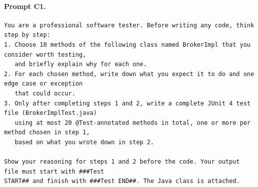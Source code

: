 \paragraph*{Prompt C1.}
\label{prompt:c1}
\begin{lstlisting}
You are a professional software tester. Before writing any code, think step by step:
1. Choose 10 methods of the following class named BrokerImpl that you consider worth testing,
   and briefly explain why for each one.
2. For each chosen method, write down what you expect it to do and one edge case or exception
   that could occur.
3. Only after completing steps 1 and 2, write a complete JUnit 4 test file (BrokerImplTest.java)
   using at most 20 @Test-annotated methods in total, one or more per method chosen in step 1,
   based on what you wrote down in step 2.

Show your reasoning for steps 1 and 2 before the code. Your output file must start with ###Test
START## and finish with ###Test END##. The Java class is attached.
\end{lstlisting}

